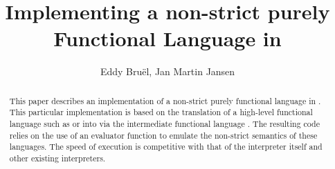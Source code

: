\documentclass{llncs}
\begin{document}
\pagestyle{headings}  %
\mainmatter              %

\title{Implementing a non-strict purely Functional Language in \JavaScript}
%
\author{Eddy Bru\"el, Jan Martin Jansen}
%
%
%
%

\maketitle              %

\begin{abstract}
This paper describes an implementation of a non-strict purely functional language in \JavaScript.
This particular implementation is based on the translation of a high-level functional language such as 
\Haskell or \Clean into \JavaScript via the intermediate functional language \Sapl. 
The resulting code relies on the use of an evaluator function to emulate the non-strict semantics of 
these languages.
The speed of execution is competitive with that of the \Sapl interpreter itself 
and other existing interpreters.
\end{abstract}











\end{document}
